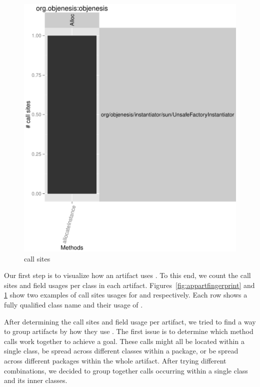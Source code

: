 \begin{figure}[!ht]
\includegraphics[page=5,width=0.9\columnwidth]{chapters/unsafe/artifacts}
\caption{ call sites}
\label{fig:langartfingerprint}
\end{figure}

Our first step is to visualize how an artifact uses \unsafe{}.
To this end, we count the \unsafe{} call sites and field usages per class in each artifact.
Figures~\ref{fig:appartfingerprint} and \ref{fig:langartfingerprint} show two examples of call sites usages for  and  respectively.
Each row shows a fully qualified class name and their usage of \smu{}.

After determining the call sites and field usage per artifact, we tried to find a way to group artifacts by how they use \smu{}.
The first issue is to determine which method calls work together to achieve a goal.
These calls might all be located within a single class, be spread across different classes within a package, or be spread across different packages within the whole artifact.
After trying different combinations, we decided to group together calls occurring within a single class and its inner classes.

